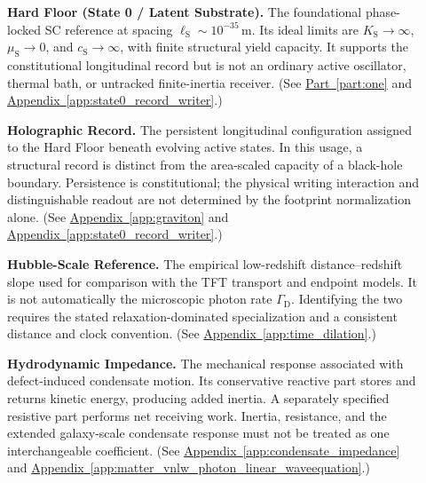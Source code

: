 \begin{description}
\item[] \begin{minipage}[t]{\linewidth}
\textbf{Hard Floor (State 0 / Latent Substrate).} The foundational phase-locked SC reference at spacing $\ell_{\mathrm S}\sim10^{-35}\,\mathrm m$. Its ideal limits are $K_{\mathrm S}\to\infty$, $\mu_{\mathrm S}\to0$, and $c_{\mathrm S}\to\infty$, with finite structural yield capacity. It supports the constitutional longitudinal record but is not an ordinary active oscillator, thermal bath, or untracked finite-inertia receiver.
(See \hyperref[part:one]{Part~\ref*{part:one}} and \hyperref[app:state0_record_writer]{Appendix~\ref*{app:state0_record_writer}}.)
\end{minipage}

\item[] \begin{minipage}[t]{\linewidth}
\textbf{Holographic Record.} The persistent longitudinal configuration assigned to the Hard Floor beneath evolving active states. In this usage, a structural record is distinct from the area-scaled capacity of a black-hole boundary. Persistence is constitutional; the physical writing interaction and distinguishable readout are not determined by the footprint normalization alone.
(See \hyperref[app:graviton]{Appendix~\ref*{app:graviton}} and \hyperref[app:state0_record_writer]{Appendix~\ref*{app:state0_record_writer}}.)
\end{minipage}

\item[] \begin{minipage}[t]{\linewidth}
\textbf{Hubble-Scale Reference.} The empirical low-redshift distance--redshift slope used for comparison with the TFT transport and endpoint models. It is not automatically the microscopic photon rate $\Gamma_{\mathrm D}$. Identifying the two requires the stated relaxation-dominated specialization and a consistent distance and clock convention.
(See \hyperref[app:time_dilation]{Appendix~\ref*{app:time_dilation}}.)
\end{minipage}

\item[] \begin{minipage}[t]{\linewidth}
\textbf{Hydrodynamic Impedance.} The mechanical response associated with defect-induced condensate motion. Its conservative reactive part stores and returns kinetic energy, producing added inertia. A separately specified resistive part performs net receiving work. Inertia, resistance, and the extended galaxy-scale condensate response must not be treated as one interchangeable coefficient.
(See \hyperref[app:condensate_impedance]{Appendix~\ref*{app:condensate_impedance}} and \hyperref[app:matter_vnlw_photon_linear_waveequation]{Appendix~\ref*{app:matter_vnlw_photon_linear_waveequation}}.)
\end{minipage}


\end{description}
